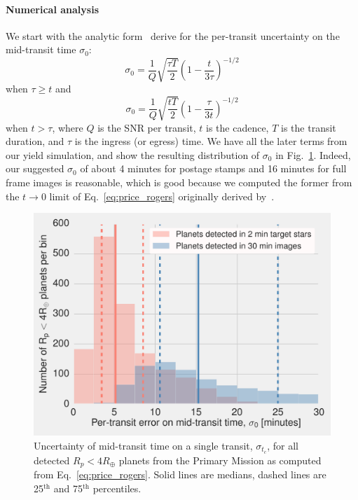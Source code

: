 \paragraph{Numerical analysis}
We start with the analytic form~\citet{price_transit_2014} derive for the per-transit uncertainty on the mid-transit time $\sigma_0$:
$$
\sigma_{0} = \frac{1}{Q} \sqrt{ \frac{\tau T}{2} } \left( 1 - \frac{t}{3\tau} \right)^{-1/2}
$$
when $\tau\geq t$ and 
\begin{equation}
	\sigma_{0} = \frac{1}{Q} \sqrt{\frac{t T }{2}} \left( 1 - \frac{\tau}{3t} \right)^{-1/2}
	\label{eq:price_rogers}
\end{equation}
when $t > \tau$,
where $Q$ is the SNR per transit, $t$ is the cadence, $T$ is the transit duration, and $\tau$ is the ingress (or egress) time.
We have all the later terms from our yield simulation, and show the resulting distribution of $\sigma_0$ in Fig.~\ref{fig:uncertainty_tc_hist}.
Indeed, our suggested $\sigma_0$ of about 4 minutes for postage stamps and 16 minutes for full frame images is reasonable, which is good because we computed the former from the $t\rightarrow0$ limit of Eq.~\ref{eq:price_rogers} originally derived by~\citet{carter_analytic_2008}.
\begin{figure}[!t]
	\centering
	\includegraphics[scale=1.]{figures/mid_transit_time_vs_cadence.pdf}
	\caption{Uncertainty of mid-transit time on a single transit, $\sigma_{t_c}$, for all detected $R_p<4R_\oplus$ planets from the Primary Mission as computed from Eq.~\protect\ref{eq:price_rogers}.
		Solid lines are medians, dashed lines are 25$^\mathrm{th}$ and 75$^\mathrm{th}$ percentiles.
	}
	\label{fig:uncertainty_tc_hist}
\end{figure}
